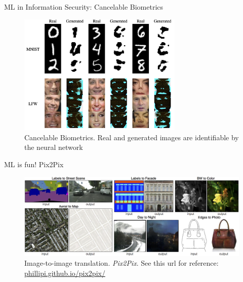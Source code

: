 \documentclass{beamer}
\begin{document}
     \begin{frame}{ML in Information Security: Cancelable Biometrics}
    	    \begin{figure}
            \centering
                \includegraphics[width=0.7\textwidth]{images/presentation/cancelable.png}
                \caption{Cancelable Biometrics. Real and generated images are identifiable by the neural network}
            \end{figure}
    	\end{frame}

    \begin{frame}{ML is fun! Pix2Pix}
	    \begin{figure}
        \centering
            \includegraphics[width=\textwidth]{images/presentation/pix2pix.png}
            \caption{Image-to-image translation. \textit{Pix2Pix}. See this url for reference: \href{https://phillipi.github.io/pix2pix/}{phillipi.github.io/pix2pix/}}
        \end{figure}
	\end{frame}
\end{document}
